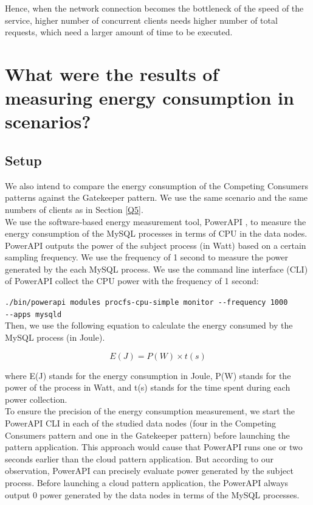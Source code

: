 \documentclass{article}
\begin{document}
Hence, when the network connection becomes the bottleneck of the speed of the service, higher number of concurrent clients needs higher number of total requests, which need a larger amount of time to be executed.

\section{What were the results of measuring energy consumption in scenarios?}\label{Q6}
\subsection{Setup}
We also intend to compare the energy consumption of the Competing Consumers patterns against the Gatekeeper pattern. We use the same scenario and the same numbers of clients as in Section \ref{Q5}.\\

We use the software-based energy measurement tool, PowerAPI \cite{}, to measure the energy consumption of the MySQL processes in terms of CPU in the data nodes. PowerAPI outputs the power of the subject process (in Watt) based on a certain sampling frequency. We use the frequency of 1 second to measure the power generated by the each MySQL process. We use the command line interface (CLI) of PowerAPI collect the CPU power with the frequency of 1 second:

\texttt{./bin/powerapi modules procfs-cpu-simple monitor -{}-frequency 1000 \\-{}-apps mysqld}\\

Then, we use the following equation to calculate the energy consumed by the MySQL process (in Joule).

\begin{equation} \label{eq:energy}
E(J) = P(W) \times t(s)
\end{equation}

where E(J) stands for the energy consumption in Joule, P(W) stands for the power of the process in Watt, and t(s) stands for the time spent during each power collection.\\

To ensure the precision of the energy consumption measurement, we start the PowerAPI CLI in each of the studied data nodes (four in the Competing Consumers pattern and one in the Gatekeeper pattern) before launching the pattern application. This approach would cause that PowerAPI runs one or two seconds earlier than the cloud pattern application. But according to our observation, PowerAPI can precisely evaluate power generated by the subject process. Before launching a cloud pattern application, the PowerAPI always output 0 power generated by the data nodes in terms of the MySQL processes.
\end{document}
